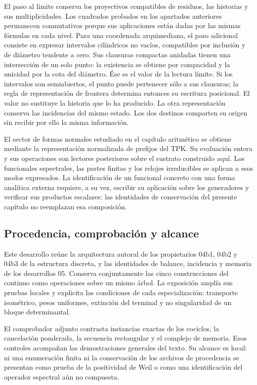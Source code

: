 El paso al límite conserva los proyectivos compatibles de residuos, las historias y sus multiplicidades. Los cuadrados probados en los apartados anteriores permanecen conmutativos porque sus aplicaciones están dadas por las mismas fórmulas en cada nivel. Para una coordenada arquimediana, el paso adicional consiste en expresar intervalos cilíndricos no vacíos, compatibles por inclusión y de diámetro tendente a cero. Sus clausuras compactas anidadas tienen una intersección de un solo punto: la existencia se obtiene por compacidad y la unicidad por la cota del diámetro. Ése es el valor de la lectura límite. Si los intervalos son semiabiertos, el punto puede pertenecer sólo a sus clausuras; la regla de representación de frontera determina entonces su escritura posicional. El valor no sustituye la historia que lo ha producido. La otra representación conserva las incidencias del mismo estado. Los dos destinos comparten su origen sin recibir por ello la misma información.

El sector de formas normales estudiado en el capítulo aritmético se obtiene mediante la representación normalizada de prefijos del TPK. Su evaluación entera y sus operaciones son lectores posteriores sobre el sustrato construido aquí. Los funcionales espectrales, las partes finitas y los relojes irreducibles se aplican a esos modos expresados. La identificación de un funcional concreto con una forma analítica externa requiere, a su vez, escribir su aplicación sobre los generadores y verificar sus productos escalares: las identidades de conservación del presente capítulo no reemplazan esa composición.

\clearpage
\subsection{Procedencia, comprobación y alcance}
Este desarrollo reúne la arquitectura autoral de los propietarios 04b1, 04b2 y 04b3 de la estructura discreta, y las identidades de balance, incidencia y memoria de los desarrollos 05. Conserva conjuntamente las cinco construcciones del continuo como operaciones sobre un mismo árbol. La exposición amplía sus pruebas locales y explicita las condiciones de cada especialización: transporte isométrico, pesos uniformes, extinción del terminal y no singularidad de un bloque determinantal.

El comprobador adjunto contrasta instancias exactas de los cociclos, la cancelación ponderada, la secuencia rectangular y el complejo de memoria. Esos controles acompañan las demostraciones generales del texto. Su alcance es local: ni una enumeración finita ni la conservación de los archivos de procedencia se presentan como prueba de la positividad de Weil o como una identificación del operador espectral aún no compuesta.
